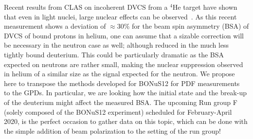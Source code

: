 Recent results from CLAS on incoherent DVCS from a $^4$He target have shown that
even in light nuclei, large nuclear effects can be observed~\cite{Hattawy:2018liu}.
As this recent measurement shows a deviation of $\approx 30$\% for the beam spin asymmetry (BSA)
of DVCS of bound protons in helium, one can assume that a sizable correction 
will be necessary in the neutron case as well; although reduced in the much 
less tightly bound deuterium. This could be particularly dramatic as the BSA 
expected on neutrons are rather small, making the nuclear suppression observed in helium
of a similar size as the signal expected for the neutron. We propose here to transpose the methods 
developed for BONuS12 for PDF measurements~\cite{bonus12} to the GPDs. In 
particular, we are looking how the initial state and the break-up of the 
deuterium might affect the measured BSA. The upcoming Run group F (solely composed of
the BONuS12 experiment) scheduled 
for February-April 2020, is the perfect occasion to gather data on this topic, 
which can be done with the simple addition of beam polarization to the setting 
of the run group!

